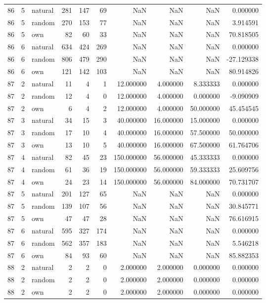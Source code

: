 \begin{table}[htbp]
\begin{tabular}{rrlrrrrrrr}
86 & 5 & natural & 281 & 147 & 69 & NaN & NaN & NaN & 0.000000 \\
86 & 5 & random & 270 & 153 & 77 & NaN & NaN & NaN & 3.914591 \\
86 & 5 & own & 82 & 60 & 33 & NaN & NaN & NaN & 70.818505 \\
86 & 6 & natural & 634 & 424 & 269 & NaN & NaN & NaN & 0.000000 \\
86 & 6 & random & 806 & 479 & 290 & NaN & NaN & NaN & -27.129338 \\
86 & 6 & own & 121 & 142 & 103 & NaN & NaN & NaN & 80.914826 \\
87 & 2 & natural & 11 & 4 & 1 & 12.000000 & 4.000000 & 8.333333 & 0.000000 \\
87 & 2 & random & 12 & 4 & 0 & 12.000000 & 4.000000 & 0.000000 & -9.090909 \\
87 & 2 & own & 6 & 4 & 2 & 12.000000 & 4.000000 & 50.000000 & 45.454545 \\
87 & 3 & natural & 34 & 15 & 3 & 40.000000 & 16.000000 & 15.000000 & 0.000000 \\
87 & 3 & random & 17 & 10 & 4 & 40.000000 & 16.000000 & 57.500000 & 50.000000 \\
87 & 3 & own & 13 & 10 & 5 & 40.000000 & 16.000000 & 67.500000 & 61.764706 \\
87 & 4 & natural & 82 & 45 & 23 & 150.000000 & 56.000000 & 45.333333 & 0.000000 \\
87 & 4 & random & 61 & 36 & 19 & 150.000000 & 56.000000 & 59.333333 & 25.609756 \\
87 & 4 & own & 24 & 23 & 14 & 150.000000 & 56.000000 & 84.000000 & 70.731707 \\
87 & 5 & natural & 201 & 127 & 65 & NaN & NaN & NaN & 0.000000 \\
87 & 5 & random & 139 & 107 & 56 & NaN & NaN & NaN & 30.845771 \\
87 & 5 & own & 47 & 47 & 28 & NaN & NaN & NaN & 76.616915 \\
87 & 6 & natural & 595 & 327 & 174 & NaN & NaN & NaN & 0.000000 \\
87 & 6 & random & 562 & 357 & 183 & NaN & NaN & NaN & 5.546218 \\
87 & 6 & own & 84 & 93 & 60 & NaN & NaN & NaN & 85.882353 \\
88 & 2 & natural & 2 & 2 & 0 & 2.000000 & 2.000000 & 0.000000 & 0.000000 \\
88 & 2 & random & 2 & 2 & 0 & 2.000000 & 2.000000 & 0.000000 & 0.000000 \\
88 & 2 & own & 2 & 2 & 0 & 2.000000 & 2.000000 & 0.000000 & 0.000000 \\

\end{tabular}
\end{table}
